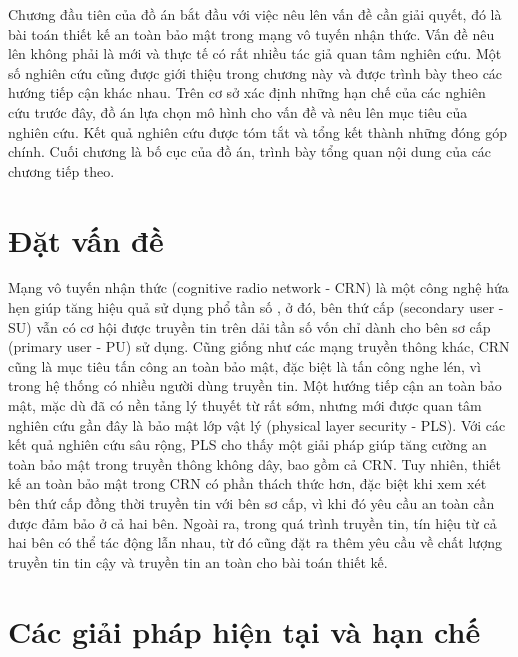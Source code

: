\documentclass[../main.tex]{subfiles}
\begin{document}
\label{chap1}

Chương đầu tiên của đồ án bắt đầu với việc nêu lên vấn đề cần giải quyết, đó là bài toán thiết kế an toàn bảo mật trong mạng vô tuyến nhận thức. Vấn đề nêu lên không phải là mới và thực tế có rất nhiều tác giả quan tâm nghiên cứu. Một số nghiên cứu cũng được giới thiệu trong chương này và được trình bày theo các hướng tiếp cận khác nhau. Trên cơ sở xác định những hạn chế của các nghiên cứu trước đây, đồ án lựa chọn mô hình cho vấn đề và nêu lên mục tiêu của nghiên cứu. Kết quả nghiên cứu được tóm tắt và tổng kết thành những đóng góp chính. Cuối chương là bố cục của đồ án, trình bày tổng quan nội dung của các chương tiếp theo.

\section{Đặt vấn đề}
\label{sec:dvd}

Mạng vô tuyến nhận thức (cognitive radio network - CRN) là một công nghệ hứa hẹn giúp tăng hiệu quả sử dụng phổ tần số \cite{liang2011}, ở đó, bên thứ cấp (secondary user - SU) vẫn có cơ hội được truyền tin trên dải tần số vốn chỉ dành cho bên sơ cấp (primary user - PU) sử dụng. Cũng giống như các mạng truyền thông khác, CRN cũng là mục tiêu tấn công an toàn bảo mật, đặc biệt là tấn công nghe lén, vì trong hệ thống có nhiều người dùng truyền tin. Một hướng tiếp cận an toàn bảo mật, mặc dù đã có nền tảng lý thuyết từ rất sớm, nhưng mới được quan tâm nghiên cứu gần đây là bảo mật lớp vật lý (physical layer security - PLS). Với các kết quả nghiên cứu sâu rộng, PLS cho thấy một giải pháp giúp tăng cường an toàn bảo mật trong truyền thông không dây, bao gồm cả CRN. Tuy nhiên, thiết kế an toàn bảo mật trong CRN có phần thách thức hơn, đặc biệt khi xem xét bên thứ cấp đồng thời truyền tin với bên sơ cấp, vì khi đó yêu cầu an toàn cần được đảm bảo ở cả hai bên. Ngoài ra, trong quá trình truyền tin, tín hiệu từ cả hai bên có thể tác động lẫn nhau, từ đó cũng đặt ra thêm yêu cầu về chất lượng truyền tin tin cậy và truyền tin an toàn cho bài toán thiết kế.

\section{Các giải pháp hiện tại và hạn chế}
\label{sec:giaiphap}
\end{document}
